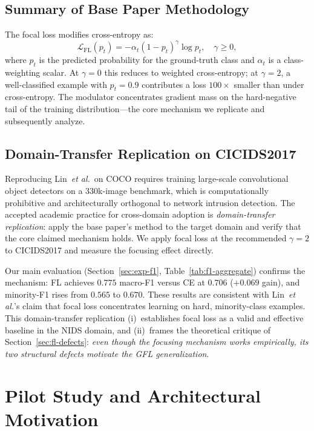 \documentclass[conference]{IEEEtran}
\theoremstyle{definition}
\begin{document}
\subsection{Summary of Base Paper Methodology}

The focal loss modifies cross-entropy as:
\[
\mathcal{L}_{\mathrm{FL}}(p_t) = -\alpha_t(1-p_t)^\gamma \log p_t, \quad \gamma \ge 0,
\]
where $p_t$ is the predicted probability for the ground-truth class and $\alpha_t$ is a class-weighting scalar. At $\gamma=0$ this reduces to weighted cross-entropy; at $\gamma=2$, a well-classified example with $p_t=0.9$ contributes a loss $100\times$ smaller than under cross-entropy. The modulator concentrates gradient mass on the hard-negative tail of the training distribution---the core mechanism we replicate and subsequently analyze.

\subsection{Domain-Transfer Replication on CICIDS2017}

Reproducing Lin~\emph{et al.}\ on COCO requires training large-scale convolutional object detectors on a 330k-image benchmark, which is computationally prohibitive and architecturally orthogonal to network intrusion detection. The accepted academic practice for cross-domain adoption is \emph{domain-transfer replication}: apply the base paper's method to the target domain and verify that the core claimed mechanism holds. We apply focal loss at the recommended $\gamma=2$ to CICIDS2017 and measure the focusing effect directly.

Our main evaluation (Section~\ref{sec:exp-f1}, Table~\ref{tab:f1-aggregate}) confirms the mechanism: FL achieves $0.775$ macro-F1 versus CE at $0.706$ ($+0.069$ gain), and minority-F1 rises from $0.565$ to $0.670$. These results are consistent with Lin~\emph{et al.}'s claim that focal loss concentrates learning on hard, minority-class examples. This domain-transfer replication (i)~establishes focal loss as a valid and effective baseline in the NIDS domain, and (ii)~frames the theoretical critique of Section~\ref{sec:fl-defects}: \emph{even though the focusing mechanism works empirically, its two structural defects motivate the GFL generalization}.

\section{Pilot Study and Architectural Motivation}
\label{sec:pilot}
\end{document}
